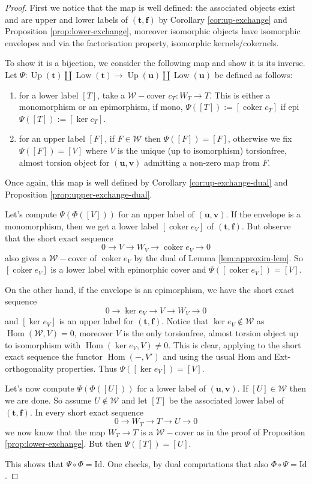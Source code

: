 \documentclass[10pt,a4paper]{amsart}
\newcommand{\coker}{\operatorname{coker}}
\newcommand{\W}{\mathcal W}
\newcommand{\Hom}{\operatorname{Hom}}
\newcommand{\Up}{\operatorname{Up}}
\newcommand{\Low}{\operatorname{Low}}
\newcommand{\tpair}[2]{(\mathbf{#1}, \mathbf{#2})  }
\begin{document}
\begin{proof}
First we notice that the map is well defined: the associated objects exist and are upper and lower labels of \( \tpair{t}{f} \) by Corollary \ref{cor:up-exchange} and  Proposition \ref{prop:lower-exchange}, moreover isomorphic objects have isomorphic envelopes and via the factorisation property, isomorphic kernels/cokernels.

To show it is a bijection, we consider the following map and show it is its inverse.
Let \( \Psi :  \Up(\mathbf t)\coprod \Low(\mathbf t) \to  \Up(\mathbf u)\coprod \Low(\mathbf u) \) be defined as follows:
\begin{enumerate}
\item  for a lower label $ [T] $, take  a \(\mathcal{W}-\)cover \( c_T : W_T \to T \).  This is either a monomorphism or an epimorphism, if mono, $ \Psi([T]) := [\coker c_T] $ if epi $ \Psi([T]) := [\ker c_T] $.
\item for an upper label \( [F] \), if \( F \in \mathcal{W} \) then \( \Psi([F]) = [F] \), otherwise we fix \( \Psi([F]) = [V] \) where \( V \) is the unique (up to isomorphism) torsionfree, almost torsion object for \( \tpair{u}{v} \) admitting a non-zero map from \( F \).
\end{enumerate}

Once again, this map is well defined by Corollary \ref{cor:up-exchange-dual} and  Proposition \ref{prop:upper-exchange-dual}. 

Let's compute \( \Psi(\Phi([V])) \) for an upper label of \( \tpair{u}{v} \). If the envelope is a monomorphism, then we get a lower label \(  [\coker e_V] \) of \( \tpair{t}{f} \). But observe that the short exact sequence
\[
0 \to V \to W_V \to \coker e_V \to 0
\]
also gives a \( \mathcal{W}-\)cover of \( \coker e_V \) by the dual of Lemma \ref{lem:approxim-lem}. So \( [\coker e_V] \) is a lower label with epimorphic cover and \( \Psi( [\coker e_V] ) = [ V] \).

On the other hand, if the envelope is an epimorphism, we have the short exact sequence
\[
0 \to \ker e_V \to V \to W_V \to 0
\]
and \( [ \ker e_V ] \) is an upper label for \( \tpair{t}{f} \). Notice that \( \ker e_V \not \in \W \) as \( \Hom(\mathcal{W}, V) = 0 \), moreover \( V \) is the only torsionfree, almost torsion object up to isomorphism with \( \Hom( \ker e_V, V) \ne 0 \). This is clear, applying to the short exact sequence the functor \( \Hom(-, V') \) and using the usual Hom and Ext-orthogonality properties. Thus \( \Psi([\ker e_V ]) = [V] \). 

Let's now compute  \( \Psi(\Phi([U])) \) for a lower label of \( \tpair{u}{v} \). If \( [U] \in \mathcal{W} \) then we are done. So assume \( U \not \in \mathcal{W} \) and let \( [T] \) be the associated lower label of \( \tpair{t}{f} \). In every short exact sequence
\[
0 \to W_T \to T \to U \to 0
\] 
we now know that the map \( W_T \to T \) is a \( \mathcal{W}-\)cover as in the proof of Proposition \ref{prop:lower-exchange}. But then \( \Psi([T]) = [U] \). 

This shows that \( \Psi \circ \Phi = \mathrm{Id} \). One checks, by dual computations that also \( \Phi \circ \Psi = \mathrm{Id} \).
\end{proof}
\end{document}
